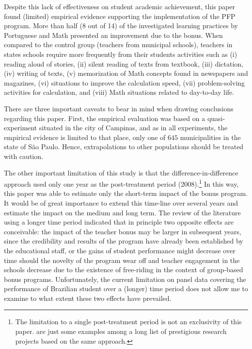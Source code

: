 \documentclass[a4paper, 12pt]{article}
\begin{document}
Despite this lack of effectiveness on student academic achievement, this paper found (limited) empirical evidence supporting the implementation of the PFP program. More than half (8 out of 14) of the investigated learning practices by Portuguese and Math presented an improvement due to the bonus. When compared to the control group (teachers from municipal schools), teachers in states schools require more frequently from their students activities such as (i) reading aloud of stories, (ii) silent reading of texts from textbook, (iii) dictation, (iv) writing of texts, (v) memorization of Math concepts found in newspapers and magazines, (vi) situations to improve the calculation speed, (vii) problem-solving activities for calculation, and (viii) Math situations related to day-to-day life.


There are three important caveats to bear in mind when drawing conclusions regarding this paper. First, the empirical evaluation was based on a quasi-experiment situated in the city of Campinas, and as in all experiments, the empirical evidence is limited to that place, only one of $645$ municipalities in the state of São Paulo. Hence, extrapolations to other populations should be treated with caution. 


The other important limitation of this study is that the difference-in-difference approach used only one year as the post-treatment period (2008).\footnote{The limitation to a single post-treatment period is not an exclusivity of this paper. \citet{loyalka2019pay, muralidharan2011teacher, lavy2009performance} are just some examples among a long list of prestigious research projects based on the same approach.} In this way, this paper was able to estimate only the short-term impact of the bonus program. It would be of great importance to extend this time-line over several years and estimate the impact on the medium and long term. The review of the literature using a longer time period \citep[see e.g.][]{barrera2017teacher, imberman2015incentive, glewwe2010teacher} indicated that in principle two opposite effects are conceivable: the impact of the teacher bonus may be larger in subsequent years, since the credibility and results of the program have already been established by the educational staff, or the gains of student performance might decrease over time should the novelty of the program wear off and teacher engagement in the schools decrease due to the existence of free-riding in the context of group-based bonus programs. Unfortunately, the current limitation on panel data covering the performance of Brazilian student over a (longer) time period does not allow me to examine to what extent these two effects have prevailed. 
\end{document}
